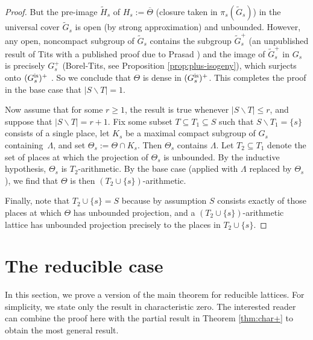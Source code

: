 \documentclass[JEP,XML,SOM,Unicode,published]{cedram}
\let\bs\backslash
\theoremstyle{definition}
\begin{document}
\begin{proof}
But the pre-image $\widetilde{H}_s$ of $H_s:=\overline{\Theta}$ (closure taken in $\pi_s(\widetilde{G}_s)$) in the universal cover $\widetilde{G}_s$ is open (by strong approximation) and unbounded. However, any open, noncompact subgroup of $\widetilde{G}_s$ contains the subgroup $\widetilde{G}_s^+$ (an unpublished result of Tits with a published proof due to Prasad \cite{prasad-tits}) and the image of $\widetilde{G}_s^+$ in $G_s$ is precisely $G_s^+$ (Borel-Tits, see Proposition \ref{prop:plus-isogeny}), which surjects onto $(G_s^{\textup{is}})^+$ . So we conclude that $\Theta$ is dense in $(G_s^{\textup{is}})^+$. This completes the proof in the base case that $|S\bs T|=1$.

Now assume that for some $r\geq 1$, the result is true whenever $|S\bs T|\leq r$, and suppose that $|S\bs T|=r+1$. Fix some subset $T\subseteq T_1\subseteq S$ such that $S\bs T_1 = \{s\}$ consists of a single place, let $K_s$ be a maximal compact subgroup of $G_s$ containing~$\Lambda$, and set $\Theta_s:=\Theta\cap K_s$. Then $\Theta_s$ contains $\Lambda$. Let $T_2\subseteq T_1$ denote the set of places at which the projection of $\Theta_s$ is unbounded. By the inductive hypothesis, $\Theta_s$ is $T_2$\nobreakdash-arith\-metic. By the base case (applied with $\Lambda$ replaced by $\Theta_s$), we find that $\Theta$ is then $(T_2\cup\{s\})$-arithmetic.

Finally, note that $T_2\cup\{s\}=S$ because by assumption $S$ consists exactly of those places at which $\Theta$ has unbounded projection, and a $(T_2\cup \{s\})$-arithmetic lattice has unbounded projection precisely to the places in $T_2\cup\{s\}$.\end{proof}

\section{The reducible case} \label{sec:reducible}
In this section, we prove a version of the main theorem for reducible lattices. For simplicity, we state only the result in characteristic zero. The interested reader can combine the proof here with the partial result in Theorem \ref{thm:char+} to obtain the most general result.
\end{document}
